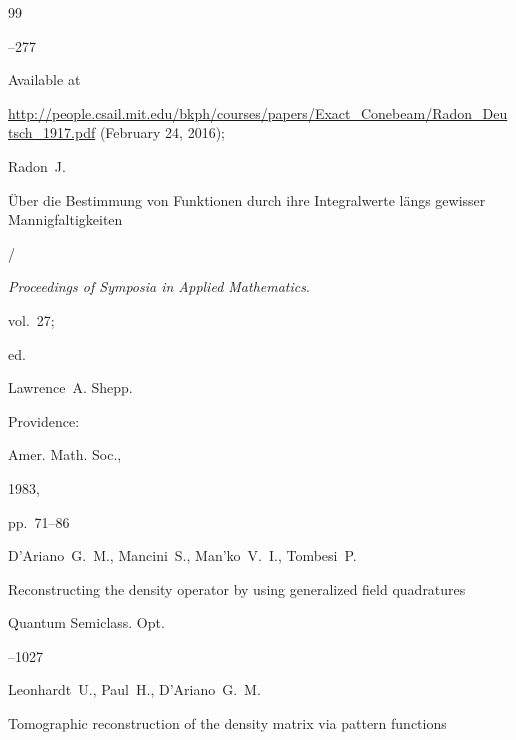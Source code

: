 \begin{thebibliography}{99}

--277

\elink Available at 

 \url{http://people.csail.mit.edu/bkph/courses/papers/Exact_Conebeam/Radon_Deutsch_1917.pdf}    (February 24, 2016);



Radon~J. 


\"Uber die Bestimmung von Funktionen durch ihre Integralwerte l\"angs gewisser Mannigfaltigkeiten


/

{\it Proceedings of Symposia in Applied Mathematics}.


vol.~27;


ed.

Lawrence~A. Shepp.


Providence:


Amer. Math. Soc.,


1983,


pp.~71--86







\by   D'Ariano~G.~M., Mancini~S., Man'ko~V.~I., Tombesi~P.

\paper Reconstructing the density operator by using generalized field quadratures

 \jour Quantum Semiclass. Opt. 




--1027







\by Leonhardt~U.,  Paul~H., D'Ariano~G.~M.

\paper Tomographic reconstruction of the density matrix via pattern functions


\end{thebibliography}
